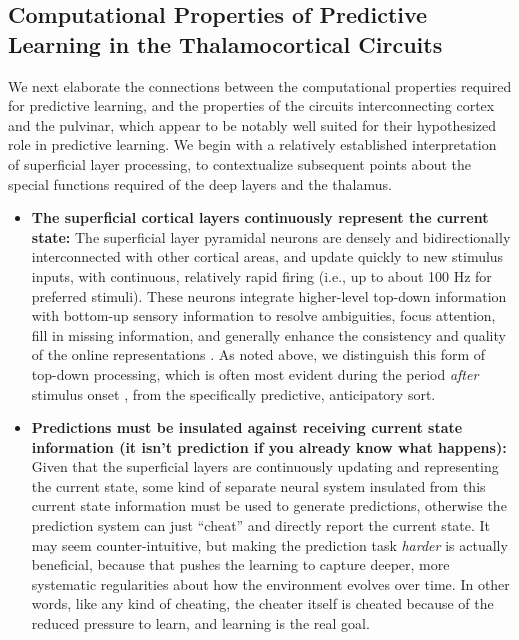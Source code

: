 \documentclass[11pt,twoside]{article}
\newif\myifpdf
\begin{document}
\subsection{Computational Properties of Predictive Learning in the Thalamocortical Circuits}

We next elaborate the connections between the computational properties required for predictive learning, and the properties of the circuits interconnecting cortex and the pulvinar, which appear to be notably well suited for their hypothesized role in predictive learning.  We begin with a relatively established interpretation of superficial layer processing, to contextualize subsequent points about the special functions required of the deep layers and the thalamus.

\begin{itemize}

	\item {\bf The superficial cortical layers continuously represent the current state:}  The superficial layer pyramidal neurons are densely and bidirectionally interconnected with other cortical areas, and update quickly to new stimulus inputs, with continuous, relatively rapid firing (i.e., up to about 100 Hz for preferred stimuli).  These neurons integrate higher-level top-down information with bottom-up sensory information to resolve ambiguities, focus attention, fill in missing information, and generally enhance the consistency and quality of the online representations \citep{RumelhartMcClelland82,Hopfield84,DesimoneDuncan95,ReynoldsChelazziDesimone99,MillerCohen01,OReillyWyatteHerdEtAl13,OReillyMunakataFrankEtAl12,OReillyHazyHerd16}. As noted above, we distinguish this form of top-down processing, which is often most evident during the period \emph{after} stimulus onset \citep{LeeMumford03}, from the specifically predictive, anticipatory sort.

	\item {\bf Predictions must be insulated against receiving current state information (it isn't prediction if you already know what happens):} Given that the superficial layers are continuously updating and representing the current state, some kind of separate neural system insulated from this current state information must be used to generate predictions, otherwise the prediction system can just ``cheat'' and directly report the current state.  It may seem counter-intuitive, but making the prediction task \emph{harder} is actually beneficial, because that pushes the learning to capture deeper, more systematic regularities about how the environment evolves over time.  In other words, like any kind of cheating, the cheater itself is cheated because of the reduced pressure to learn, and learning is the real goal.  


\end{itemize}
\end{document}
